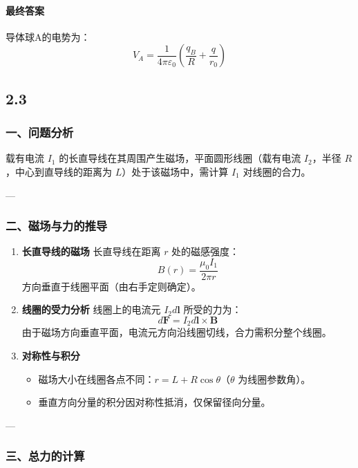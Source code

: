 \documentclass{article}
\begin{document}
{\paragraph*{最终答案}

导体球A的电势为：  
\[
\boxed{
V_A = \frac{1}{4\pi\varepsilon_0} \left( \frac{q_B}{R} + \frac{q}{r_0} \right)
}
\]


\subsection*{2.3}


\subsubsection*{一、问题分析}

载有电流 \( I_1 \) 的长直导线在其周围产生磁场，平面圆形线圈（载有电流 \( I_2 \)，半径 \( R \)，中心到直导线的距离为 \( L \)）处于该磁场中，需计算 \( I_1 \) 对线圈的合力。

---

\subsubsection*{二、磁场与力的推导}

\begin{enumerate}
    \item \textbf{长直导线的磁场}  
    长直导线在距离 \( r \) 处的磁感强度：  
    \[
    B(r) = \frac{\mu_0 I_1}{2\pi r}
    \]  
    方向垂直于线圈平面（由右手定则确定）。

    \item \textbf{线圈的受力分析}  
    线圈上的电流元 \( I_2 d\mathbf{l} \) 所受的力为：  
    \[
    d\mathbf{F} = I_2 d\mathbf{l} \times \mathbf{B}
    \]  
    由于磁场方向垂直平面，电流元方向沿线圈切线，合力需积分整个线圈。

    \item \textbf{对称性与积分}  
    \begin{itemize}
        \item 磁场大小在线圈各点不同：\( r = L + R \cos\theta \)（\(\theta\) 为线圈参数角）。  
        \item 垂直方向分量的积分因对称性抵消，仅保留径向分量。
    \end{itemize}
\end{enumerate}

---

\subsubsection*{三、总力的计算}

}
\end{document}
